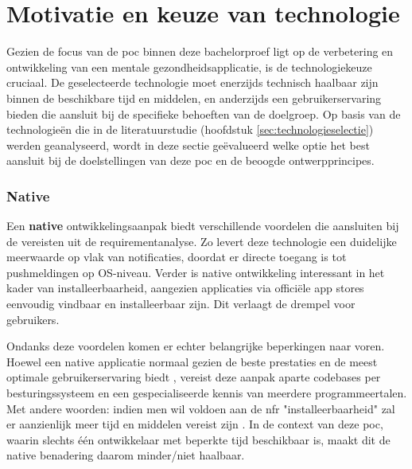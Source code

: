 \vspace{1em}

\section{Motivatie en keuze van technologie}
\label{sec:app-tech-keuze}

\vspace{1em}

Gezien de focus van de \acrshort{poc} binnen deze bachelorproef ligt op de verbetering en ontwikkeling van een mentale gezondheidsapplicatie, is de technologiekeuze cruciaal. De geselecteerde technologie moet enerzijds technisch haalbaar zijn binnen de beschikbare tijd en middelen, en anderzijds een gebruikerservaring bieden die aansluit bij de specifieke behoeften van de doelgroep. Op basis van de technologieën die in de literatuurstudie (hoofdstuk \ref{sec:technologieselectie}) werden geanalyseerd, wordt in deze sectie geëvalueerd welke optie het best aansluit bij de doelstellingen van deze \acrlong{poc} en de beoogde ontwerpprincipes.

\vspace{1em}

\subsubsection{Native}
\label{subsubsec:native}

\vspace{1em}

Een \textbf{native} ontwikkelingsaanpak biedt verschillende voordelen die aansluiten bij de vereisten uit de requirementanalyse. Zo levert deze technologie een duidelijke meerwaarde op vlak van notificaties, doordat er directe toegang is tot pushmeldingen op OS-niveau. Verder is native ontwikkeling interessant in het kader van installeerbaarheid, aangezien applicaties via officiële app stores eenvoudig vindbaar en installeerbaar zijn. Dit verlaagt de drempel voor gebruikers.

\vspace{1em}

Ondanks deze voordelen komen er echter belangrijke beperkingen naar voren. Hoewel een native applicatie normaal gezien de beste prestaties en de meest optimale gebruikerservaring biedt \autocite{Samsyudin2025}, vereist deze aanpak aparte codebases per besturingssysteem en een gespecialiseerde kennis van meerdere programmeertalen. Met andere woorden: indien men wil voldoen aan de \acrshort{nfr} "installeerbaarheid" zal er aanzienlijk meer tijd en middelen vereist zijn \autocite{Gerges2024}. In de context van deze \acrshort{poc}, waarin slechts één ontwikkelaar met beperkte tijd beschikbaar is, maakt dit de native benadering daarom minder/niet haalbaar.

